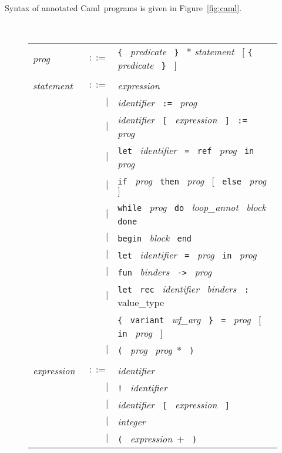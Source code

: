 \documentclass[12pt]{report}
\newcommand{\caml}{\textsf{Caml}}
\newcommand{\te}[1]{\texttt{#1}~}
\newcommand{\nt}[1]{\textsl{#1}~}
\begin{document}
Syntax of annotated \caml\ programs is given in Figure~\ref{fig:caml}.
\begin{figure}[htbp]
\begin{center}
\hrulefill\\
\begin{tabular}{lrl}
  \nt{prog} 
    & $::=$ & \te{\{} \nt{predicate} \te{\}} $*$
              \nt{statement} 
              $[$ \te{\{} \nt{predicate} \te{\}} $]$ \\

       & & \\[0.1em]

  \nt{statement}
    & $::=$ & \nt{expression} \\
      & $|$ & \nt{identifier}  \te{:=}  \nt{prog} \\
      & $|$ & \nt{identifier}  \te{[}  \nt{expression}  \te{]}
              \te{:=}  \nt{prog} \\
      & $|$ & \te{let}  \nt{identifier}  \te{=}  \te{ref} 
              \nt{prog}  \te{in}  \nt{prog} \\
      & $|$ & \te{if}  \nt{prog}  \te{then}  \nt{prog}
              $[$~ \te{else}  \nt{prog} $]$ \\
      & $|$ & \te{while}  \nt{prog}  \te{do}
              \nt{loop\_annot}  \nt{block}  \te{done} \\
      & $|$ & \te{begin}  \nt{block}  \te{end} \\
      & $|$ & \te{let}  \nt{identifier}  \te{=}  \nt{prog} 
              \te{in}  \nt{prog} \\
      & $|$ & \te{fun}  \nt{binders}  \te{->}  \nt{prog} \\
      & $|$ & \te{let}  \te{rec}  \nt{identifier}  \nt{binders}  \te{:}
              value\_type \\
      &     & \te{\{}  \te{variant}  \nt{wf\_arg}  \te{\}}
              \te{=}  \nt{prog}  $[$~ \te{in}  \nt{prog} $]$ \\
      & $|$ & \te{(}  \nt{prog}  \nt{prog}$*$~  \te{)} \\

      & & \\[0.1em]

  \nt{expression}
    & $::=$ & \nt{identifier} \\
      & $|$ & \te{!}  \nt{identifier} \\
      & $|$ & \nt{identifier}  \te{[}  \nt{expression}  \te{]} \\
      & $|$ & \nt{integer} \\
      & $|$ & \te{(}  \nt{expression}$+$~  \te{)} \\


\end{tabular}
\end{center}
\end{figure}
\end{document}
